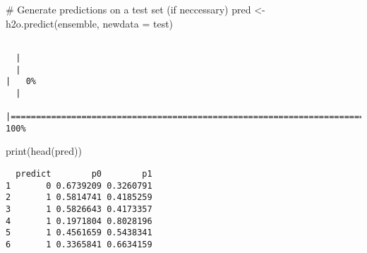 \documentclass[
  letterpaper,
  DIV=11,
  numbers=noendperiod]{scrartcl}
\newenvironment{Shaded}{\begin{snugshade}}{\end{snugshade}}
\newcommand{\AttributeTok}[1]{\textcolor[rgb]{0.40,0.45,0.13}{#1}}
\newcommand{\CommentTok}[1]{\textcolor[rgb]{0.37,0.37,0.37}{#1}}
\newcommand{\FunctionTok}[1]{\textcolor[rgb]{0.28,0.35,0.67}{#1}}
\newcommand{\NormalTok}[1]{\textcolor[rgb]{0.00,0.23,0.31}{#1}}
\newcommand{\OtherTok}[1]{\textcolor[rgb]{0.00,0.23,0.31}{#1}}
\begin{document}
\begin{Shaded}
\begin{Highlighting}[]
\CommentTok{\# Generate predictions on a test set (if neccessary)}
\NormalTok{pred }\OtherTok{\textless{}{-}} \FunctionTok{h2o.predict}\NormalTok{(ensemble, }\AttributeTok{newdata =}\NormalTok{ test)}
\end{Highlighting}
\end{Shaded}

\begin{verbatim}

  |                                                                            
  |                                                                      |   0%
  |                                                                            
  |======================================================================| 100%
\end{verbatim}

\begin{Shaded}
\begin{Highlighting}[]
\FunctionTok{print}\NormalTok{(}\FunctionTok{head}\NormalTok{(pred))}
\end{Highlighting}
\end{Shaded}

\begin{verbatim}
  predict        p0        p1
1       0 0.6739209 0.3260791
2       1 0.5814741 0.4185259
3       1 0.5826643 0.4173357
4       1 0.1971804 0.8028196
5       1 0.4561659 0.5438341
6       1 0.3365841 0.6634159
\end{verbatim}
\end{document}
